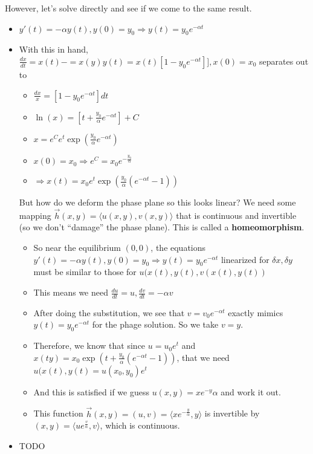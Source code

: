 \documentclass[11pt, oneside]{article}   	%
\begin{document}
However, let's solve directly and see if we come to the same result. 
\begin{itemize}
\item $y'(t) = -\alpha y(t), y(0) = y_0 \Rightarrow y(t) = y_0 e^{-\alpha t}$
\item With this in hand, $\frac{dx}{dt} = x(t) -= x(y)y(t) = x(t)[1-y_0e^{-\alpha t}]] , x(0) = x_0$ separates out to 
\begin{itemize}
\item $\frac{dx}{x} = [1-y_0e^{-\alpha t}]dt $
\item $\ln(x) = [t + \frac{y_0}{\alpha}e^{-\alpha t}] + C $
\item $x = e^Ce^t \exp(\frac{y_0}{\alpha}e^{-\alpha t})$
\item $x(0) = x_0 \Rightarrow e^C = x_0e^{-\frac{y_0}{\alpha}}$
\item $\Rightarrow x(t) = x_0 e^t \exp(\frac{y_0}{\alpha}(e^{-\alpha t} - 1))$
\end{itemize}

But how do we deform the phase plane so this looks linear?  We need some mapping $\vec{h}(x,y) = \langle u(x,y), v(x,y) \rangle$ that is continuous and invertible (so we don't ``damage'' the phase plane).  This is called a \textbf{homeomorphism}.
\begin{itemize}
\item So near the equilibrium $(0,0)$, the equations  $y'(t) = -\alpha y(t), y(0) = y_0 \Rightarrow y(t) = y_0 e^{-\alpha t}$ linearized for $\delta x, \delta y$ must be similar to those for $u(x(t), y(t), v(x(t), y(t))$
\item This means we need $\frac{du}{dt} = u, \frac{dv}{dt} = -\alpha v$
\item After doing the substitution, we see that $v = v_0e^{-\alpha t}$ exactly mimics $y(t) = y_0 e^{-\alpha t}$ for the phage solution.  So we take $v = y$.
\item Therefore, we know that since $u = u_0e^t$ and $x(ty) = x_0 \exp(t + \frac{y_0}{\alpha}(e^{-\alpha t} - 1))$, that we need $u(x(t), y(t) = u(x_0, y_0)e^t$
\item And this is satisfied if we guess $u(x,y) = xe^{-y}{\alpha}$ and work it out.
\item This function $\vec{h}(x,y) = (u, v) = \langle xe^{-\frac{y}{\alpha}}, y \rangle $ is invertible by $(x,y) = \langle ue^{\frac{v}{\alpha}} , v \rangle$, which is continuous.
\end{itemize}

\end{itemize}


\begin{itemize}
\item TODO 
\end{itemize}
\end{document}
